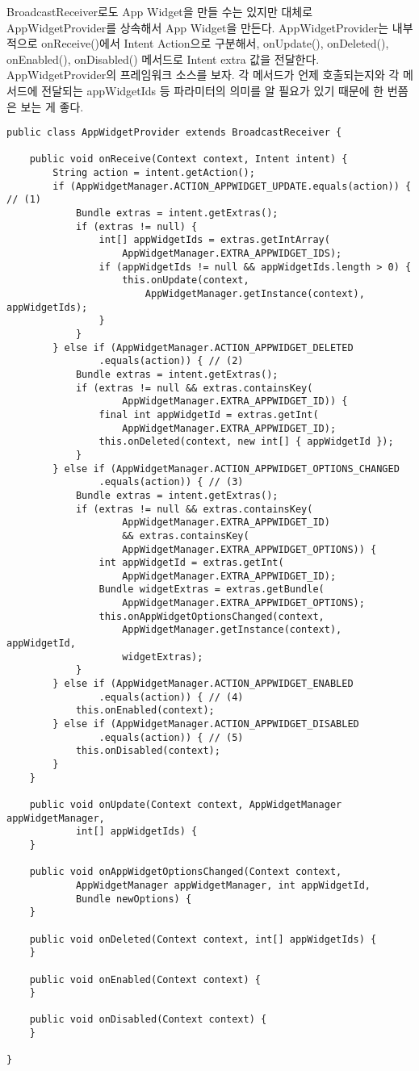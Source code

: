 BroadcastReceiver로도 App Widget을 만들 수는 있지만 대체로 AppWidgetProvider를 상속해서 App Widget을 만든다. 
AppWidgetProvider는 내부적으로 onReceive()에서 Intent Action으로 구분해서, onUpdate(), onDeleted(), onEnabled(), onDisabled() 메서드로 Intent extra 값을 전달한다.\\

AppWidgetProvider의 프레임워크 소스를 보자. 각 메서드가 언제 호출되는지와 각 메서드에 전달되는 appWidgetIds 등 파라미터의 의미를 알 필요가 있기 때문에 한 번쯤은 보는 게 좋다.
\begin{lstlisting}[frame=single, caption=AppWidgetProvider.java] 
public class AppWidgetProvider extends BroadcastReceiver {

	public void onReceive(Context context, Intent intent) {
		String action = intent.getAction();
		if (AppWidgetManager.ACTION_APPWIDGET_UPDATE.equals(action)) { // (1)
			Bundle extras = intent.getExtras();
			if (extras != null) {
				int[] appWidgetIds = extras.getIntArray(
					AppWidgetManager.EXTRA_APPWIDGET_IDS);
				if (appWidgetIds != null && appWidgetIds.length > 0) {
					this.onUpdate(context,
						AppWidgetManager.getInstance(context), appWidgetIds);
				}
			}
		} else if (AppWidgetManager.ACTION_APPWIDGET_DELETED
				.equals(action)) { // (2)
			Bundle extras = intent.getExtras();
			if (extras != null && extras.containsKey(
					AppWidgetManager.EXTRA_APPWIDGET_ID)) {
				final int appWidgetId = extras.getInt(
					AppWidgetManager.EXTRA_APPWIDGET_ID);
				this.onDeleted(context, new int[] { appWidgetId });
			}
		} else if (AppWidgetManager.ACTION_APPWIDGET_OPTIONS_CHANGED
				.equals(action)) { // (3)
			Bundle extras = intent.getExtras();
			if (extras != null && extras.containsKey(
					AppWidgetManager.EXTRA_APPWIDGET_ID)
					&& extras.containsKey(
					AppWidgetManager.EXTRA_APPWIDGET_OPTIONS)) {
				int appWidgetId = extras.getInt(
					AppWidgetManager.EXTRA_APPWIDGET_ID);
				Bundle widgetExtras = extras.getBundle(
					AppWidgetManager.EXTRA_APPWIDGET_OPTIONS);
				this.onAppWidgetOptionsChanged(context,
					AppWidgetManager.getInstance(context), appWidgetId, 
					widgetExtras);
			}
		} else if (AppWidgetManager.ACTION_APPWIDGET_ENABLED
				.equals(action)) { // (4)
			this.onEnabled(context);
		} else if (AppWidgetManager.ACTION_APPWIDGET_DISABLED
				.equals(action)) { // (5)
			this.onDisabled(context);
		}
	}

	public void onUpdate(Context context, AppWidgetManager appWidgetManager,
			int[] appWidgetIds) {
	}
	
	public void onAppWidgetOptionsChanged(Context context, 
			AppWidgetManager appWidgetManager, int appWidgetId,
			Bundle newOptions) {
	}

	public void onDeleted(Context context, int[] appWidgetIds) {
	}

	public void onEnabled(Context context) {
	}

	public void onDisabled(Context context) {
	}
	
}
\end{lstlisting}
